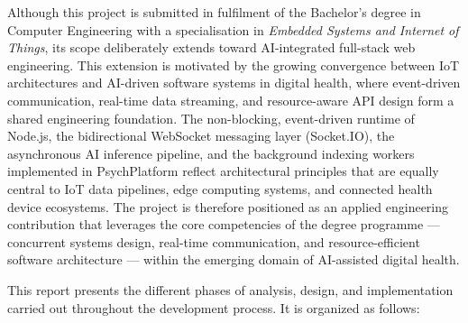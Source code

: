 \documentclass[a4paper,12pt]{report}
\begin{document}
\vspace{0.3cm}

Although this project is submitted in fulfilment of the Bachelor's degree in
Computer Engineering with a specialisation in \emph{Embedded Systems and
Internet of Things}, its scope deliberately extends toward AI-integrated
full-stack web engineering. This extension is motivated by the growing
convergence between IoT architectures and AI-driven software systems in
digital health, where event-driven communication, real-time data streaming,
and resource-aware API design form a shared engineering foundation.
The non-blocking, event-driven runtime of Node.js, the bidirectional
WebSocket messaging layer (Socket.IO), the asynchronous AI inference pipeline,
and the background indexing workers implemented in PsychPlatform reflect
architectural principles that are equally central to IoT data pipelines,
edge computing systems, and connected health device ecosystems.
The project is therefore positioned as an applied engineering contribution
that leverages the core competencies of the degree programme — concurrent
systems design, real-time communication, and resource-efficient software
architecture — within the emerging domain of AI-assisted digital health.

\vspace{0.4cm}

This report presents the different phases of analysis, design, and
implementation carried out throughout the development process. It is organized
as follows:

\vspace{0.3cm}
\end{document}
